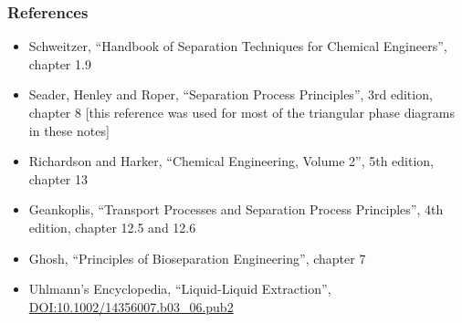 \begin{frame}\frametitle{References}
	\begin{itemize}
		\item	Schweitzer, ``Handbook of Separation Techniques for Chemical Engineers'', chapter 1.9
		\item	Seader, Henley and Roper, ``Separation Process Principles'', 3rd edition, chapter 8 {\small [this reference was used for most of the triangular phase diagrams in these notes]}
		\item	Richardson and Harker, ``Chemical Engineering, Volume 2'', 5th edition, chapter 13
		\item	Geankoplis, ``Transport Processes and Separation Process Principles'', 4th edition, chapter 12.5 and 12.6
		\item	Ghosh, ``Principles of Bioseparation Engineering'', chapter 7
		\item	Uhlmann's Encyclopedia, ``Liquid-Liquid Extraction'',  \href{http://dx.doi.org/10.1002/14356007.b03\_06.pub2}{DOI:10.1002/14356007.b03\_06.pub2}
	\end{itemize}
\end{frame}

